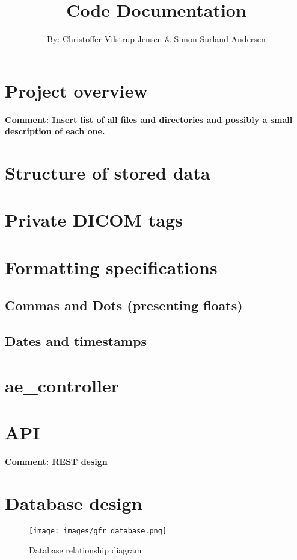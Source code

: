 \documentclass{article}
\title{Code Documentation}
\author{By: Christoffer Vilstrup Jensen \& Simon Surland Andersen}
\newcommand{\makecomment}[1]{{\color{red} \bf Comment: #1}}
\begin{document}
\maketitle

\section{Project overview}
\makecomment{Insert list of all files and directories and possibly a small description of each one.}

\section{Structure of stored data}


\section{Private DICOM tags}


\section{Formatting specifications}
\subsection{Commas and Dots (presenting floats)}


\subsection{Dates and timestamps}


\section{ae\_controller}


\section{API}
\makecomment{REST design}

\section{Database design}
\begin{figure}[h]
	\centering
	\texttt{[image: images/gfr\_database.png]}
	\caption{Database relationship diagram}
\end{figure}
\end{document}
